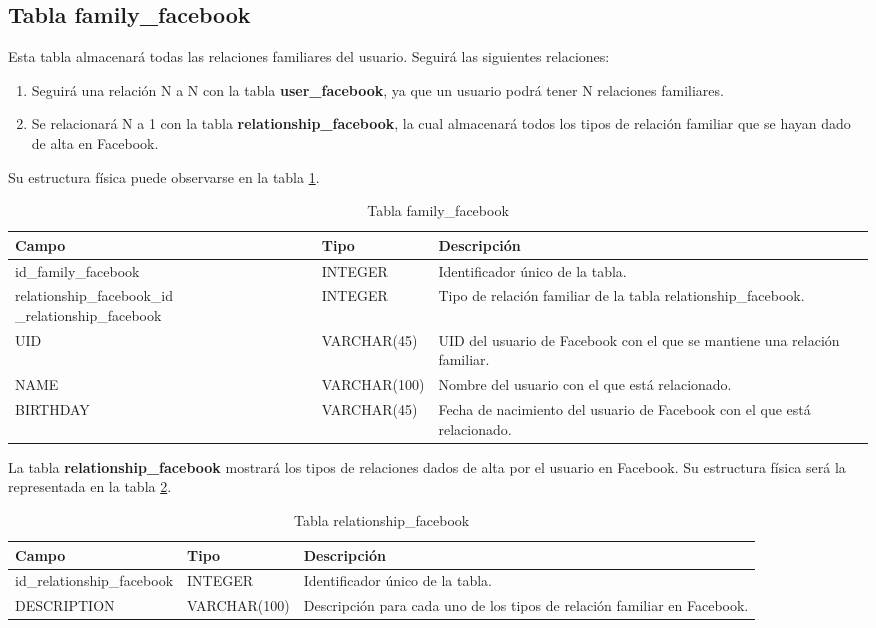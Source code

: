 \subsection{Tabla family\_facebook}
Esta tabla almacenará todas las relaciones familiares del usuario. Seguirá las siguientes relaciones:
\begin{enumerate}
\item Seguirá una relación N a N con la tabla \textbf{user\_facebook}, ya que un usuario podrá tener N relaciones familiares.
\item Se relacionará N a 1 con la tabla \textbf{relationship\_facebook}, la cual almacenará todos los tipos de relación familiar que se hayan dado de alta en Facebook.
\end{enumerate}
\bigskip
\par
Su estructura física puede observarse en la tabla \ref{tabFamilyFacebook}.
\bigskip
\par
\begin{table}[h]
\begin{center}
\begin{tabular}{| p{55mm}  | l | p{60mm} |}\hline
\textbf{Campo}&\textbf{Tipo}&\textbf{Descripción} \\ \hline
id\_family\_facebook & INTEGER & Identificador único de la tabla. \\ \hline
relationship\_facebook\_id \_relationship\_facebook & INTEGER & Tipo de relación familiar de la tabla relationship\_facebook. \\ \hline
UID & VARCHAR(45) & UID del usuario de Facebook con el que se mantiene una relación familiar. \\ \hline
NAME & VARCHAR(100) & Nombre del usuario con el que está relacionado. \\ \hline
BIRTHDAY & VARCHAR(45) & Fecha de nacimiento del usuario de Facebook con el que está relacionado. \\ \hline
\end{tabular}
\end{center}
\caption{Tabla family\_facebook} \label{tabFamilyFacebook}
\end{table}
\bigskip
\par
La tabla \textbf{relationship\_facebook} mostrará los tipos de relaciones dados de alta por el usuario en Facebook. Su estructura física será la representada en la tabla \ref{tabRelationshipFacebook}.
\bigskip
\par
\begin{table}[h]
\begin{center}
\begin{tabular}{| l | l | p{60mm} |}\hline
\textbf{Campo}&\textbf{Tipo}&\textbf{Descripción} \\ \hline
id\_relationship\_facebook & INTEGER & Identificador único de la tabla. \\ \hline
DESCRIPTION & VARCHAR(100) & Descripción para cada uno de los tipos de relación familiar en Facebook. \\ \hline
\end{tabular}
\end{center}
\caption{Tabla relationship\_facebook} \label{tabRelationshipFacebook}
\end{table}

